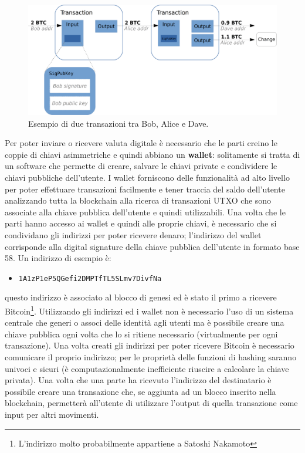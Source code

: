 \begin{figure}
    \centering
    \includegraphics[width=\textwidth]{./images/tx-schema.png}
    \caption{Esempio di due transazioni tra Bob, Alice e Dave.}
\end{figure}
Per poter inviare o ricevere valuta digitale è necessario che le parti creino le coppie di chiavi asimmetriche e quindi abbiano un \textbf{wallet}: solitamente si tratta di un software che permette di creare, salvare le chiavi private e condividere le chiavi pubbliche dell'utente.\newline
I wallet forniscono delle funzionalità ad alto livello per poter effettuare transazioni facilmente e tener traccia del saldo dell'utente analizzando tutta la blockchain alla ricerca di transazioni UTXO che sono associate alla chiave pubblica dell'utente e quindi utilizzabili.\newline
Una volta che le parti hanno accesso ai wallet e quindi alle proprie chiavi, è necessario che si condividano gli indirizzi per poter ricevere denaro; l'indirizzo del wallet corrisponde alla digital signature della chiave pubblica dell'utente in formato base 58.\newline
Un indirizzo di esempio è:
\begin{itemize}[]
    \centering
    \item \texttt{1A1zP1eP5QGefi2DMPTfTL5SLmv7DivfNa}
\end{itemize}
questo indirizzo è associato al blocco di genesi ed è stato il primo a ricevere Bitcoin\footnote{L'indirizzo molto probabilmente appartiene a Satoshi Nakamoto}.\newline
Utilizzando gli indirizzi ed i wallet non è necessario l'uso di un sistema centrale che generi o associ delle identità agli utenti ma è possibile creare una chiave pubblica ogni volta che lo si ritiene necessario (virtualmente per ogni transazione).\newline
Una volta creati gli indirizzi per poter ricevere Bitcoin è necessario comunicare il proprio indirizzo; per le proprietà delle funzioni di hashing saranno univoci e sicuri (è computazionalmente inefficiente riuscire a calcolare la chiave privata). Una volta che una parte ha ricevuto l'indirizzo del destinatario è possibile creare una transazione che, se aggiunta ad un blocco inserito nella blockchain, permetterà all'utente di utilizzare l'output di quella transazione come input per altri movimenti.\newline
